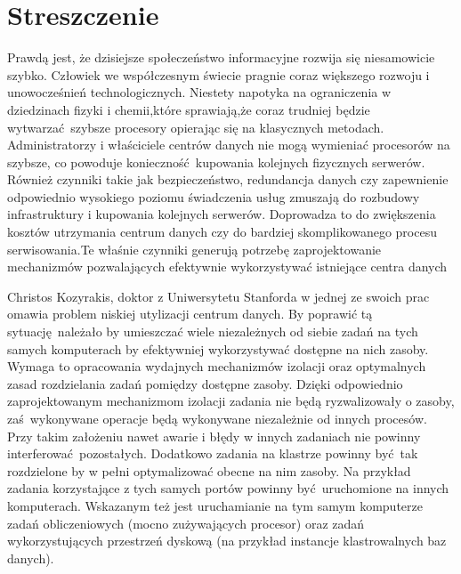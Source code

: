 \documentclass[10pt,a4paper,titlepage,twoside]{report}
\begin{document}
%


\setlength{\parindent}{1.25cm}


\setcounter{page}{3}
\onehalfspacing
\justify
\section*{Streszczenie}
\indent\indent Prawdą jest, że dzisiejsze społeczeństwo informacyjne rozwija się niesamowicie szybko. Człowiek we współczesnym świecie pragnie coraz większego rozwoju i unowocześnień technologicznych. Niestety napotyka na ograniczenia w dziedzinach fizyki i chemii,które sprawiają,że coraz trudniej będzie wytwarzać szybsze procesory opierając się na klasycznych metodach. Administratorzy i właściciele centrów danych nie mogą wymieniać procesorów na szybsze, co powoduje konieczność kupowania kolejnych fizycznych serwerów. Również czynniki takie jak bezpieczeństwo, redundancja danych czy zapewnienie odpowiednio wysokiego poziomu świadczenia usług zmuszają do rozbudowy infrastruktury i kupowania kolejnych serwerów. Doprowadza to do zwiększenia kosztów utrzymania centrum danych czy do bardziej skomplikowanego procesu serwisowania.Te właśnie czynniki generują potrzebę zaprojektowanie mechanizmów pozwalających efektywnie wykorzystywać istniejące centra danych

 Christos Kozyrakis, doktor z Uniwersytetu Stanforda w jednej ze swoich prac omawia problem niskiej utylizacji centrum danych. By poprawić tą sytuację należało by umieszczać wiele niezależnych od siebie zadań na tych samych komputerach by efektywniej wykorzystywać dostępne na nich zasoby. Wymaga to opracowania wydajnych mechanizmów izolacji oraz optymalnych zasad rozdzielania zadań pomiędzy dostępne zasoby. Dzięki odpowiednio zaprojektowanym mechanizmom izolacji zadania nie będą ryzwalizowały o zasoby, zaś wykonywane operacje będą wykonywane niezależnie od innych procesów. Przy takim założeniu nawet awarie i błędy w innych zadaniach nie powinny interferować pozostałych. Dodatkowo zadania na klastrze powinny być tak rozdzielone by w pełni optymalizować obecne na nim zasoby. Na przykład zadania korzystające z tych samych portów powinny być uruchomione na innych komputerach. Wskazanym też jest uruchamianie na tym samym komputerze zadań obliczeniowych (mocno zużywających procesor) oraz zadań wykorzystujących przestrzeń dyskową (na przykład instancje klastrowalnych baz danych).
\end{document}
